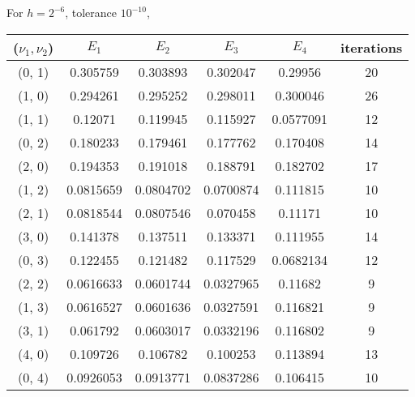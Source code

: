 \documentclass[12pt]{article}
\begin{document}
For $h=2^{-6}$, tolerance $10^{-10}$,
\begin{center}
\begin{tabular}{||c|cccc|c||}
\hline \hline
 ($\nu_1, \nu_2$)   & $E_1$ & $E_2$ &  $E_3$ & $E_4$ &   iterations \\
\hline \hline
   \color{red}(0, 1)   &    \color{red}0.305759  &   \color{red}0.303893  &   \color{red}0.302047  &   \color{red}0.29956   &   \color{red}20 \\
 (1, 0)   &  0.294261  &      0.295252  &      0.298011  &      0.300046  &           26 \\ \hline
   \color{red}(1, 1)   &   \color{red}0.12071   & \color{red}0.119945  & \color{red}0.115927  & \color{red}0.0577091 & \color{red}12 \\
 (0, 2)   &  0.180233  &      0.179461  &      0.177762  &      0.170408  &           14 \\
 (2, 0)   &  0.194353  &      0.191018  &      0.188791  &      0.182702  &           17 \\ \hline
 \color{red}(1, 2)   & \color{red}0.0815659 & \color{red}0.0804702 & \color{red}0.0700874 &      0.111815  & \color{red}10 \\
 \color{red}(2, 1)   &  0.0818544 &      0.0807546 &      0.070458  & \color{red}0.11171   & \color{red}10 \\
 (3, 0)   &  0.141378  &      0.137511  &      0.133371  &      0.111955  &           14 \\
 (0, 3)   &  0.122455  &      0.121482  &      0.117529  &      0.0682134 &           12 \\ \hline
 \color{red}(2, 2)   &  0.0616633 &      0.0601744 &      0.0327965 &      0.11682   &  \color{red}9 \\
 \color{red}(1, 3)   &  0.0616527 &      0.0601636 &      0.0327591 &      0.116821  &  \color{red}9 \\
 \color{red}(3, 1)   &  0.061792  &      0.0603017 &      0.0332196 &      0.116802  &  \color{red}9 \\
 (4, 0)   &  0.109726  &      0.106782  &      0.100253  &      0.113894  &           13 \\
 (0, 4)   &  0.0926053 &      0.0913771 &      0.0837286 &      0.106415  &           10 \\
\hline \hline
\end{tabular}
\end{center}
\end{document}
